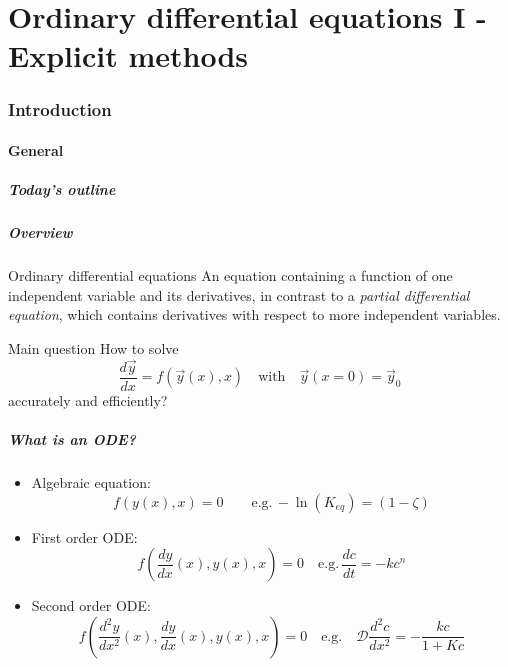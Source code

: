 \part{Ordinary differential equations I - Explicit methods}
\section{Introduction}
\subsection*{General}
\begin{frame}[label=contents_ode1]
  \frametitle{Today's outline}
\end{frame}
 
\begin{frame}
  \frametitle{Overview}
    \begin{block}{Ordinary differential equations}
      An equation containing a function of one independent variable and its derivatives, in contrast to a \emph{partial differential equation}, which contains derivatives with respect to more independent variables.
    \end{block}
    \pause
  \begin{block}{Main question}
  How to solve 
  \[
    \frac{d\vec{y}}{dx} = f(\vec{y}(x),x) \quad \text{with} \quad \vec{y}(x=0) = \vec{y}_0
  \]
  accurately and efficiently?
  \end{block}
\end{frame}

\begin{frame}
  \frametitle{What is an ODE?}
  \begin{itemize}
    \item Algebraic equation:
    \[
      f(y(x),x) = 0 \qquad \text{e.g.} \, -\ln(K_{eq})=(1-\zeta)
    \]
    \item First order ODE:
    \[
      f\left(\frac{dy}{dx}(x),y(x),x\right) = 0 \quad \text{e.g.} \, \frac{dc}{dt} = -kc^n
    \]
    \item Second order ODE:
    \[
      f\left(\frac{d^2y}{dx^2}(x),\frac{dy}{dx}(x),y(x),x \right) = 0 \quad \text{e.g.} \quad \mathcal{D}\frac{d^2c}{dx^2}= - \frac{kc}{1+Kc}
    \]
  \end{itemize}
\end{frame}

